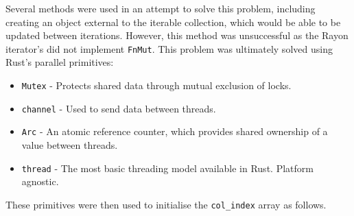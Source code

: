 Several methods were used in an attempt to solve this problem, including creating an object external to the iterable collection, which would be able to be updated between iterations. However, this method was unsuccessful as the Rayon iterator's did not implement \texttt{FnMut}. This problem was ultimately solved using Rust's parallel primitives:

\begin{itemize}
    \item \texttt{Mutex} - Protects shared data through mutual exclusion of locks.
    \item \texttt{channel} - Used to send data between threads.
    \item \texttt{Arc} - An atomic reference counter, which provides shared ownership of a value between threads.
    \item \texttt{thread} - The most basic threading model available in Rust. Platform agnostic.
\end{itemize}

These primitives were then used to initialise the \texttt{col\_index} array as follows.

